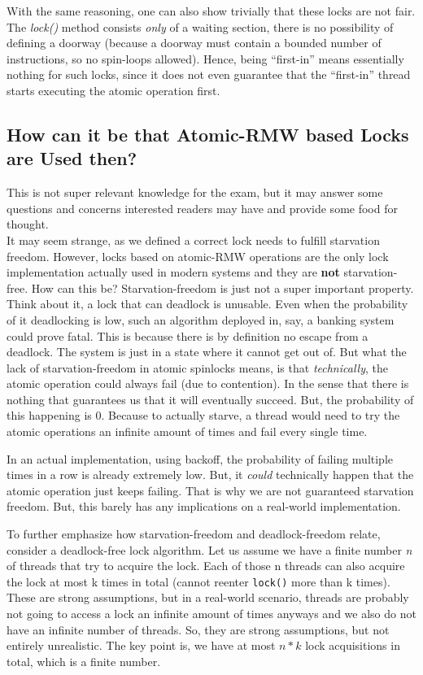\documentclass{article}
\begin{document}
    With the same reasoning, one can also show trivially that these locks are not fair. The \textit{lock()} method consists \textit{only} of a waiting section, there is no possibility of defining a doorway (because a doorway must contain a bounded number of instructions, so no spin-loops allowed). Hence, being ``first-in'' means essentially nothing for such locks, since it does not even guarantee that the ``first-in'' thread starts executing the atomic operation first.

    \subsection{How can it be that Atomic-RMW based Locks are Used then?}
    This is not super relevant knowledge for the exam, but it may answer some questions and concerns interested readers may have and provide some food for thought.\\
    It may seem strange, as we defined a correct lock needs to fulfill starvation freedom. However, locks based on atomic-RMW operations are the only lock implementation actually used in modern systems and they are \textbf{not} starvation-free. How can this be? Starvation-freedom is just not a super important property. Think about it, a lock that can deadlock is unusable. Even when the probability of it deadlocking is low, such an algorithm deployed in, say, a banking system could prove fatal. This is because there is by definition no escape from a deadlock. The system is just in a state where it cannot get out of. But what the lack of starvation-freedom in atomic spinlocks means, is that \textit{technically}, the atomic operation could always fail (due to contention). In the sense that there is nothing that guarantees us that it will eventually succeed. But, the probability of this happening is 0. Because to actually starve, a thread would need to try the atomic operations an infinite amount of times and fail every single time.

    In an actual implementation, using backoff, the probability of failing multiple times in a row is already extremely low. But, it \textit{could} technically happen that the atomic operation just keeps failing. That is why we are not guaranteed starvation freedom. But, this barely has any implications on a real-world implementation.

    To further emphasize how starvation-freedom and deadlock-freedom relate, consider a deadlock-free lock algorithm. Let us assume we have a finite number \textit{n} of threads that try to acquire the lock. Each of those n threads can also acquire the lock at most k times in total (cannot reenter \texttt{lock()} more than k times). These are strong assumptions, but in a real-world scenario, threads are probably not going to access a lock an infinite amount of times anyways and we also do not have an infinite number of threads. So, they are strong assumptions, but not entirely unrealistic. The key point is, we have at most $n*k$ lock acquisitions in total, which is a finite number.
\end{document}
